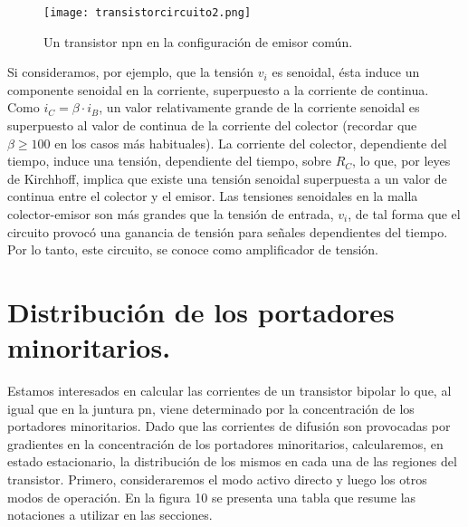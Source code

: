 \documentclass[12pt,a4paper]{article}
\begin{document}
\begin{figure}[ht!]
\begin{center}
\texttt{[image: transistorcircuito2.png]}
\caption{Un transistor npn en la configuración de emisor común.}
\end{center}
\end{figure}

Si consideramos, por ejemplo, que la tensión $v_{i}$ es senoidal, ésta induce un componente senoidal en la corriente, superpuesto a la corriente de continua. Como $i_{C}=\beta \cdot i_{B}$, un valor relativamente grande de la corriente senoidal es superpuesto al valor de continua de la corriente del colector (recordar que $\beta \geq 100$ en los casos más habituales). La corriente del colector, dependiente del tiempo, induce una tensión, dependiente del tiempo, sobre $R_{C}$, lo que, por leyes de Kirchhoff, implica que existe una tensión senoidal superpuesta a un valor de continua entre el colector y el emisor. Las tensiones senoidales en la malla colector-emisor son más grandes que la tensión de entrada, $v_{i}$, de tal forma que el circuito provocó una ganancia de tensión para señales dependientes del tiempo. Por lo tanto, este circuito, se conoce como amplificador de tensión.

\section{Distribución de los portadores minoritarios.}

Estamos interesados en calcular las corrientes de un transistor bipolar lo que, al igual que en la juntura pn, viene determinado por la concentración de los portadores minoritarios. Dado que las corrientes de difusión son provocadas por gradientes en la concentración de los portadores minoritarios, calcularemos, en estado estacionario, la distribución de los mismos en cada una de las regiones del transistor. Primero, consideraremos el modo activo directo y luego los otros modos de operación. En la figura 10 se presenta una tabla que resume las notaciones a utilizar en las secciones.
\end{document}
